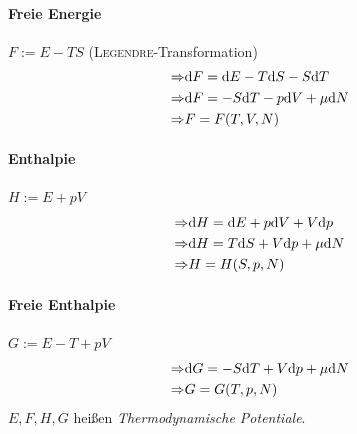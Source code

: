 \paragraph{Freie Energie} $F:=E - TS$ (\textsc{Legendre}-Transformation)
\begin{equation}
\begin{split}
  \Rightarrow & \mathrm{d} F = \mathrm{d} E - T \mathrm{d} S - S \mathrm{d} T \\
  \Rightarrow & \mathrm{d} F = -S\mathrm{d} T - p \mathrm{d} V + \mu \mathrm{d} N \\
  \Rightarrow & F=F(T, V, N)
\end{split}
\end{equation}
\paragraph{Enthalpie} $H:=E+pV$
\begin{equation}
\begin{split}
  \Rightarrow & \mathrm{d} H = \mathrm{d} E + p \mathrm{d} V + V \mathrm{d} p \\
  \Rightarrow & \mathrm{d} H = T \mathrm{d} S + V \mathrm{d} p + \mu \mathrm{d} N \\
  \Rightarrow & H=H(S, p, N)
\end{split}
\end{equation}
\paragraph{Freie Enthalpie} $G:=E-T+pV$
\begin{equation}
\begin{split}
  \Rightarrow & \mathrm{d} G = - S \mathrm{d} T + V \mathrm{d} p + \mu \mathrm{d} N \\
  \Rightarrow & G=G(T, p, N)
\end{split}
\end{equation}
$E, F, H, G$ heißen \emph{Thermodynamische Potentiale}. \\
